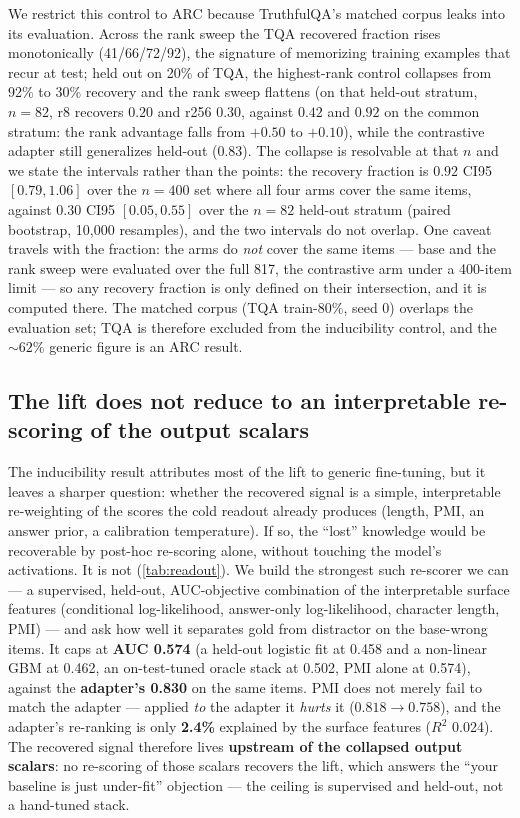 We restrict this control to ARC because TruthfulQA's matched corpus leaks into its
evaluation. Across the rank sweep the TQA recovered fraction rises monotonically
(41/66/72/92), the signature of memorizing training examples that recur at test;
held out on 20\% of TQA, the highest-rank control collapses from 92\% to 30\%
recovery and the rank sweep flattens (on that held-out stratum, $n{=}82$, r8
recovers $0.20$ and r256 $0.30$, against $0.42$ and $0.92$ on the common stratum:
the rank advantage falls from $+0.50$ to $+0.10$), while the contrastive adapter
still generalizes held-out (0.83).
The collapse is resolvable at that $n$ and we state the intervals rather than the
points: the recovery fraction is $0.92$ CI95 $[0.79, 1.06]$ over the $n{=}400$ set
where all four arms cover the same items, against $0.30$ CI95 $[0.05, 0.55]$ over
the $n{=}82$ held-out stratum (paired bootstrap, 10{,}000 resamples), and the two
intervals do not overlap. One caveat travels with the fraction: the arms do
\emph{not} cover the same items --- base and the rank sweep were evaluated over the
full 817, the contrastive arm under a 400-item limit --- so any recovery fraction is
only defined on their intersection, and it is computed there. The matched corpus (TQA train-80\%, seed
0) overlaps the evaluation set; TQA is therefore excluded from the inducibility
control, and the ${\sim}62\%$ generic figure is an ARC result.

\subsection{The lift does not reduce to an interpretable re-scoring of the output
scalars}\label{disc:channel}

The inducibility result attributes most of the lift to generic fine-tuning, but it
leaves a sharper question: whether the recovered signal is a simple, interpretable
re-weighting of the scores the cold readout already produces (length, PMI, an
answer prior, a calibration temperature). If so, the ``lost'' knowledge would be
recoverable by post-hoc re-scoring alone, without touching the model's activations.
It is not (\cref{tab:readout}). We build the strongest such re-scorer we can --- a
supervised, held-out,
AUC-objective combination of the interpretable surface features (conditional
log-likelihood, answer-only log-likelihood, character length, PMI) --- and ask how
well it separates gold from distractor on the base-wrong items. It caps at
\textbf{AUC 0.574} (a held-out logistic fit at 0.458 and a non-linear GBM at 0.462,
an on-test-tuned oracle stack at 0.502, PMI alone at 0.574), against the
\textbf{adapter's 0.830} on the same items. PMI does not merely fail to match the
adapter --- applied \emph{to} the adapter it \emph{hurts} it
($0.818 \rightarrow 0.758$), and the adapter's re-ranking is only \textbf{2.4\%}
explained by the surface features ($R^2$ 0.024). The recovered signal therefore
lives \textbf{upstream of the collapsed output scalars}: no re-scoring of those
scalars recovers the lift, which answers the ``your baseline is just under-fit''
objection --- the ceiling is supervised and held-out, not a hand-tuned stack.

